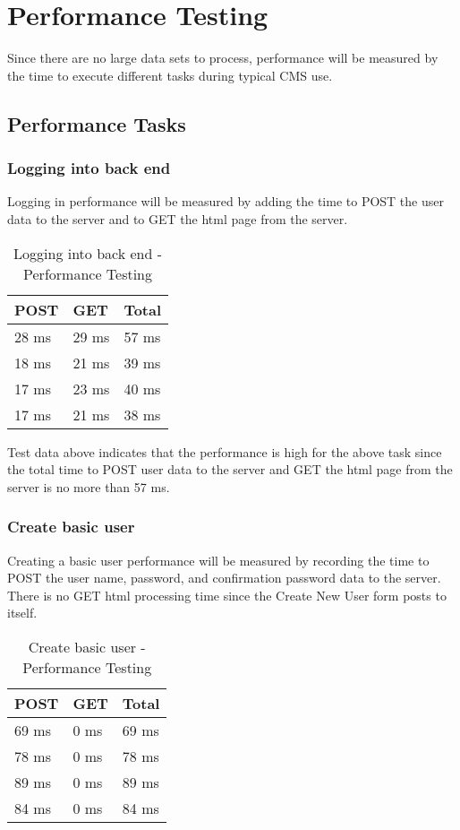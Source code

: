 \documentclass[12pt]{article}
\begin{document}
\section{Performance Testing}
Since there are no large data sets to process, performance will be measured by the time to execute different tasks during typical CMS use.  

\subsection{Performance Tasks}

\subsubsection{Logging into back end}
Logging in performance will be measured by adding the time to POST the user data to the server and to GET the html page from the server.

\begin{table}[H]
\centering
\caption{Logging into back end - Performance Testing}
\begin{tabular}{|l|l|l|}
\hline
POST  & GET   & Total \\ \hline
28 ms & 29 ms & 57 ms \\ \hline
18 ms & 21 ms & 39 ms \\ \hline
17 ms & 23 ms & 40 ms \\ \hline
17 ms & 21 ms & 38 ms \\ \hline
\end{tabular}
\end{table}

Test data above indicates that the performance is high for the above task since the total time to POST user data to the server and GET the html page from the server is no more than 57 ms. 

\subsubsection{Create basic user}
Creating a basic user performance will be measured by recording the time to POST the user name, password, and confirmation password data to the server. There is no GET html processing time since the Create New User form posts to itself.

\begin{table}[H]
\centering
\caption{Create basic user - Performance Testing}
\begin{tabular}{|l|l|l|}
\hline
POST  & GET  & Total \\ \hline
69 ms & 0 ms & 69 ms \\ \hline
78 ms & 0 ms & 78 ms \\ \hline
89 ms & 0 ms & 89 ms \\ \hline
84 ms & 0 ms & 84 ms \\ \hline
\end{tabular}
\end{table}
\end{document}
